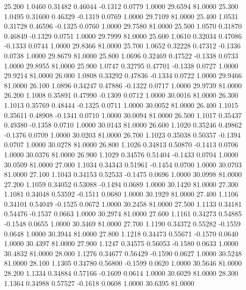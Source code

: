   25.200   1.0460   0.31482   0.46044  -0.1312   0.0779   1.0000  29.6594  81.0000
  25.300   1.0495   0.31600   0.46329  -0.1319   0.0769   1.0000  29.7109  81.0000
  25.400   1.0531   0.31728   0.46596  -0.1325   0.0760   1.0000  29.7580  81.0000
  25.500   1.0570   0.31870   0.46849  -0.1329   0.0751   1.0000  29.7999  81.0000
  25.600   1.0610   0.32034   0.47086  -0.1333   0.0744   1.0000  29.8366  81.0000
  25.700   1.0652   0.32228   0.47312  -0.1336   0.0738   1.0000  29.8679  81.0000
  25.800   1.0696   0.32469   0.47522  -0.1338   0.0733   1.0000  29.8955  81.0000
  25.900   1.0747   0.32795   0.47701  -0.1338   0.0727   1.0000  29.9214  81.0000
  26.000   1.0808   0.33292   0.47836  -0.1334   0.0722   1.0000  29.9466  81.0000
  26.100   1.0896   0.34247   0.47886  -0.1322   0.0717   1.0000  29.9739  81.0000
  26.200   1.1008   0.35891   0.47990  -0.1309   0.0712   1.0000  30.0016  81.0000
  26.300   1.1013   0.35769   0.48444  -0.1325   0.0711   1.0000  30.0052  81.0000
  26.400   1.1015   0.35611   0.48908  -0.1341   0.0710   1.0000  30.0094  81.0000
  26.500   1.1017   0.35437   0.49380  -0.1358   0.0710   1.0000  30.0143  81.0000
  26.600   1.1020   0.35246   0.49862  -0.1376   0.0709   1.0000  30.0203  81.0000
  26.700   1.1023   0.35038   0.50357  -0.1394   0.0707   1.0000  30.0278  81.0000
  26.800   1.1026   0.34813   0.50870  -0.1413   0.0706   1.0000  30.0376  81.0000
  26.900   1.1029   0.34576   0.51404  -0.1433   0.0704   1.0000  30.0509  81.0000
  27.000   1.1034   0.34343   0.51961  -0.1454   0.0700   1.0000  30.0703  81.0000
  27.100   1.1043   0.34153   0.52533  -0.1475   0.0696   1.0000  30.0998  81.0000
  27.200   1.1059   0.34052   0.53088  -0.1494   0.0689   1.0000  30.1420  81.0000
  27.300   1.1081   0.34048   0.53592  -0.1511   0.0680   1.0000  30.1929  81.0000
  27.400   1.1106   0.34101   0.54049  -0.1525   0.0672   1.0000  30.2458  81.0000
  27.500   1.1133   0.34181   0.54476  -0.1537   0.0663   1.0000  30.2974  81.0000
  27.600   1.1161   0.34273   0.54885  -0.1548   0.0655   1.0000  30.3469  81.0000
  27.700   1.1190   0.34372   0.55282  -0.1559   0.0648   1.0000  30.3944  81.0000
  27.800   1.1218   0.34473   0.55671  -0.1570   0.0640   1.0000  30.4397  81.0000
  27.900   1.1247   0.34575   0.56053  -0.1580   0.0633   1.0000  30.4832  81.0000
  28.000   1.1276   0.34677   0.56429  -0.1590   0.0627   1.0000  30.5248  81.0000
  28.100   1.1305   0.34780   0.56800  -0.1599   0.0620   1.0000  30.5646  81.0000
  28.200   1.1334   0.34884   0.57166  -0.1609   0.0614   1.0000  30.6029  81.0000
  28.300   1.1364   0.34988   0.57527  -0.1618   0.0608   1.0000  30.6395  81.0000
